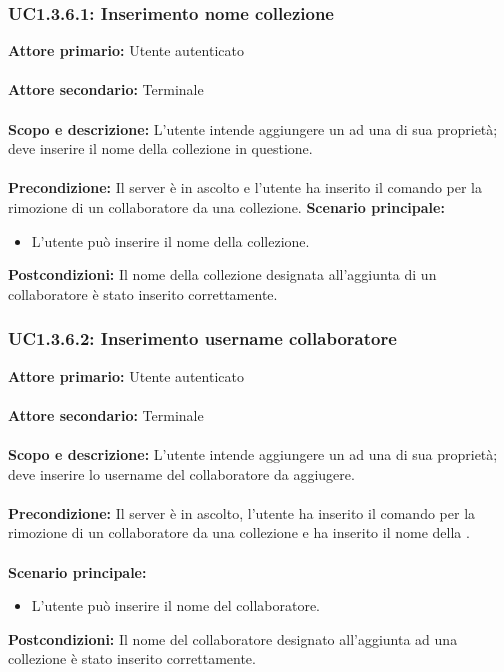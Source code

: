 \documentclass{scalatekids-article}
\begin{document}
\subsubsection{UC1.3.6.1: Inserimento nome collezione}

\textbf{Attore primario:} Utente autenticato\\ \\
\textbf{Attore secondario:} Terminale\\ \\
\textbf{Scopo e descrizione:} L'utente intende aggiungere un  ad una  di sua proprietà; deve inserire il nome della collezione in questione.\\ \\
\textbf{Precondizione:} Il server è in ascolto e l'utente ha inserito il comando per la rimozione di un collaboratore da una collezione.
\textbf{Scenario principale:}
\begin{itemize}
  \item L'utente può inserire il nome della collezione.
\end{itemize}
\textbf{Postcondizioni:} Il nome della collezione designata all'aggiunta di un collaboratore è stato inserito correttamente.

\subsubsection{UC1.3.6.2: Inserimento username collaboratore}

\textbf{Attore primario:} Utente autenticato\\ \\
\textbf{Attore secondario:} Terminale\\ \\
\textbf{Scopo e descrizione:} L'utente intende aggiungere un  ad una  di sua proprietà; deve inserire lo username del collaboratore da aggiugere.\\ \\
\textbf{Precondizione:} Il server è in ascolto, l'utente ha inserito il comando per la rimozione di un collaboratore da una collezione e ha inserito il nome della .\\ \\
\textbf{Scenario principale:}
\begin{itemize}
  \item L'utente può inserire il nome del collaboratore.
\end{itemize}
\textbf{Postcondizioni:} Il nome del collaboratore designato all'aggiunta ad una collezione è stato inserito correttamente.
\end{document}
